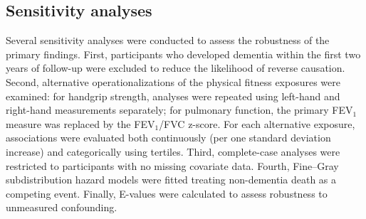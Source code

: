 \documentclass{article}
\begin{document}


\subsection*{Sensitivity analyses}

Several sensitivity analyses were conducted to assess the robustness of the primary findings. First, participants who developed dementia within the first two years of follow-up were excluded to reduce the likelihood of reverse causation. Second, alternative operationalizations of the physical fitness exposures were examined: for handgrip strength, analyses were repeated using left-hand and right-hand measurements separately; for pulmonary function, the primary FEV$_1$ measure was replaced by the FEV$_1$/FVC z-score. For each alternative exposure, associations were evaluated both continuously (per one standard deviation increase) and categorically using tertiles. Third, complete-case analyses were restricted to participants with no missing covariate data. Fourth, Fine--Gray subdistribution hazard models were fitted treating non-dementia death as a competing event. Finally, E-values were calculated to assess robustness to unmeasured confounding.
\end{document}
